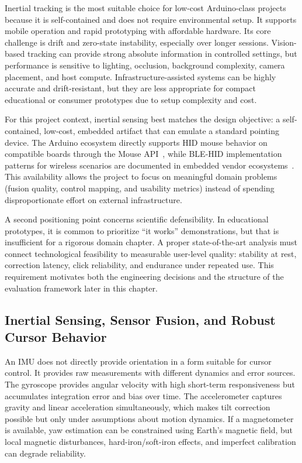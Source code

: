 Inertial tracking is the most suitable choice for low-cost Arduino-class projects because it is self-contained and does not require environmental setup. It supports mobile operation and rapid prototyping with affordable hardware. Its core challenge is drift and zero-state instability, especially over longer sessions. Vision-based tracking can provide strong absolute information in controlled settings, but performance is sensitive to lighting, occlusion, background complexity, camera placement, and host compute. Infrastructure-assisted systems can be highly accurate and drift-resistant, but they are less appropriate for compact educational or consumer prototypes due to setup complexity and cost.

For this project context, inertial sensing best matches the design objective: a self-contained, low-cost, embedded artifact that can emulate a standard pointing device. The Arduino ecosystem directly supports HID mouse behavior on compatible boards through the Mouse API~\cite{arduino_mouse_reference}, while BLE-HID implementation patterns for wireless scenarios are documented in embedded vendor ecosystems~\cite{nordic_hids_mouse_sample}. This availability allows the project to focus on meaningful domain problems (fusion quality, control mapping, and usability metrics) instead of spending disproportionate effort on external infrastructure.

A second positioning point concerns scientific defensibility. In educational prototypes, it is common to prioritize ``it works'' demonstrations, but that is insufficient for a rigorous domain chapter. A proper state-of-the-art analysis must connect technological feasibility to measurable user-level quality: stability at rest, correction latency, click reliability, and endurance under repeated use. This requirement motivates both the engineering decisions and the structure of the evaluation framework later in this chapter.

\subsection{Inertial Sensing, Sensor Fusion, and Robust Cursor Behavior}

An IMU does not directly provide orientation in a form suitable for cursor control. It provides raw measurements with different dynamics and error sources. The gyroscope provides angular velocity with high short-term responsiveness but accumulates integration error and bias over time. The accelerometer captures gravity and linear acceleration simultaneously, which makes tilt correction possible but only under assumptions about motion dynamics. If a magnetometer is available, yaw estimation can be constrained using Earth's magnetic field, but local magnetic disturbances, hard-iron/soft-iron effects, and imperfect calibration can degrade reliability.

